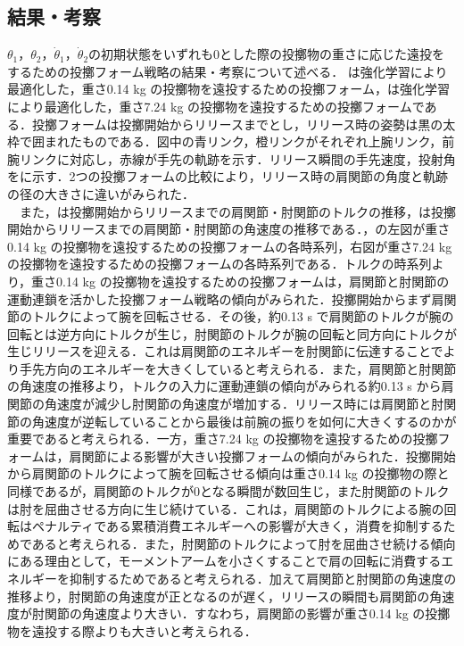 \begin{small}
\subsection{結果・考察}
$\theta_{1}$，$\theta_{2}$，$\dot{\theta}_{1}$，$\dot{\theta}_{2}$の初期状態をいずれも0とした際の投擲物の重さに応じた遠投をするための投擲フォーム戦略の結果・考察について述べる．
は強化学習により最適化した，重さ0.14 kg の投擲物を遠投するための投擲フォーム，は強化学習により最適化した，重さ7.24 kg の投擲物を遠投するための投擲フォームである．投擲フォームは投擲開始からリリースまでとし，リリース時の姿勢は黒の太枠で囲まれたものである．図中の青リンク，橙リンクがそれぞれ上腕リンク，前腕リンクに対応し，赤線が手先の軌跡を示す．リリース瞬間の手先速度，投射角をに示す．2つの投擲フォームの比較により，リリース時の肩関節の角度と軌跡の径の大きさに違いがみられた．\\
　また，は投擲開始からリリースまでの肩関節・肘関節のトルクの推移，は投擲開始からリリースまでの肩関節・肘関節の角速度の推移である．，の左図が重さ0.14 kg の投擲物を遠投するための投擲フォームの各時系列，右図が重さ7.24 kg の投擲物を遠投するための投擲フォームの各時系列である．トルクの時系列より，重さ0.14 kg の投擲物を遠投するための投擲フォームは，肩関節と肘関節の運動連鎖を活かした投擲フォーム戦略の傾向がみられた．投擲開始からまず肩関節のトルクによって腕を回転させる．その後，約0.13 s で肩関節のトルクが腕の回転とは逆方向にトルクが生じ，肘関節のトルクが腕の回転と同方向にトルクが生じリリースを迎える．これは肩関節のエネルギーを肘関節に伝達することでより手先方向のエネルギーを大きくしていると考えられる．また，肩関節と肘関節の角速度の推移より，トルクの入力に運動連鎖の傾向がみられる約0.13 s から肩関節の角速度が減少し肘関節の角速度が増加する．リリース時には肩関節と肘関節の角速度が逆転していることから最後は前腕の振りを如何に大きくするのかが重要であると考えられる．一方，重さ7.24 kg の投擲物を遠投するための投擲フォームは，肩関節による影響が大きい投擲フォームの傾向がみられた．投擲開始から肩関節のトルクによって腕を回転させる傾向は重さ0.14 kg の投擲物の際と同様であるが，肩関節のトルクが0となる瞬間が数回生じ，また肘関節のトルクは肘を屈曲させる方向に生じ続けている．これは，肩関節のトルクによる腕の回転はペナルティである累積消費エネルギーへの影響が大きく，消費を抑制するためであると考えられる．また，肘関節のトルクによって肘を屈曲させ続ける傾向にある理由として，モーメントアームを小さくすることで肩の回転に消費するエネルギーを抑制するためであると考えられる．加えて肩関節と肘関節の角速度の推移より，肘関節の角速度が正となるのが遅く，リリースの瞬間も肩関節の角速度が肘関節の角速度より大きい．すなわち，肩関節の影響が重さ0.14 kg の投擲物を遠投する際よりも大きいと考えられる．

\end{small}
